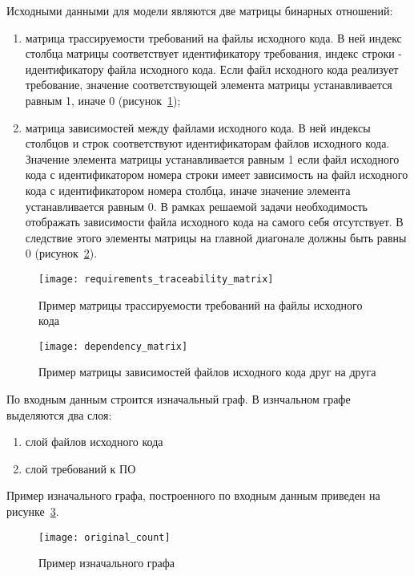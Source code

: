 Исходными данными для модели являются две матрицы бинарных отношений:
\begin{enumerate}
    \item матрица трассируемости требований на файлы исходного кода. В ней индекс столбца матрицы соответствует идентификатору требования, индекс строки - идентификатору файла исходного кода. Если файл исходного кода реализует требование, значение соответствующей элемента матрицы устанавливается равным 1, иначе 0 (рисунок~\ref{fig:requirements_traceability_matrix});
    \item матрица зависимостей между файлами исходного кода. В ней индексы столбцов и строк соответствуют идентификаторам файлов исходного кода. Значение элемента матрицы устанавливается равным 1 если файл исходного кода с идентификатором номера строки имеет зависимость на файл исходного кода с идентификатором номера столбца, иначе значение элемента устанавливается равным 0. В рамках решаемой задачи необходимость отображать зависимости файла исходного кода на самого себя отсутствует. В следствие этого элементы матрицы на главной диагонале должны быть равны 0 (рисунок~\ref{fig:dependency_matrix}).
\end{enumerate}

\begin{figure}[H]
    \centering
    \texttt{[image: requirements\_traceability\_matrix]}
    \caption{Пример матрицы трассируемости требований на файлы исходного кода}
    \label{fig:requirements_traceability_matrix}
\end{figure}

\begin{figure}[H]
    \centering
    \texttt{[image: dependency\_matrix]}
    \caption{Пример матрицы зависимостей файлов исходного кода друг на друга}
    \label{fig:dependency_matrix}
\end{figure}

По входным данным строится изначальный граф. В изнчальном графе выделяются два слоя:
\begin{enumerate}
    \item слой файлов исходного кода
    \item слой требований к ПО
\end{enumerate}

Пример изначального графа, построенного по входным данным приведен на рисунке~\ref{fig:original_count}.

\begin{figure}[H]
    \centering
    \texttt{[image: original\_count]}
    \caption{Пример изначального графа}
    \label{fig:original_count}
\end{figure}

